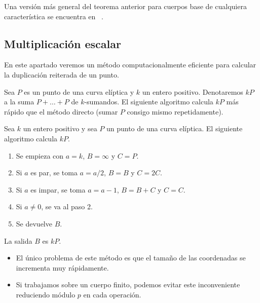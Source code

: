 \begin{nota}
	Una versión más general del teorema anterior para cuerpos base de cualquiera característica se encuentra en ~\cite{Silverman:2009}.
\end{nota}


\subsection{Multiplicación escalar}
\label{sub:Multiplicación escalar}

En este apartado veremos un método computacionalmente eficiente para calcular la duplicación reiterada de un punto.

Sea $P$ es un punto de una curva elíptica y $k$ un entero positivo. Denotaremos $k P$ a la suma $P + \ldots + P$ de $k$-sumandos. El siguiente algoritmo calcula $k P$ más rápido que el método directo (sumar $P$ consigo mismo repetidamente).

\begin{algoritmo}\label{al:multiplicación por duplicación}
	Sea $k$ un entero positivo y sea $P$ un punto de una curva elíptica. El siguiente algoritmo calcula $kP$.
	\begin{enumerate}
		\item Se empieza con $a = k$, $B = \infty$ y $C = P$.
		\item Si $a$ es par, se toma $a = a/2$, $B = B$ y $C = 2 C$.
		\item Si $a$ es impar, se toma $a = a -1$, $B = B + C$ y $C = C$.
		\item Si $a \neq 0$, se va al paso 2.
		\item Se devuelve $B$.
	\end{enumerate}
	La salida $B$ es $kP$.
\end{algoritmo}

\begin{nota}\leavevmode
	\begin{itemize}
		\item El único problema de este método es que el tamaño de las coordenadas se incrementa muy rápidamente.
		\item Si trabajamos sobre un cuerpo finito, podemos evitar este inconveniente reduciendo módulo $p$ en cada operación.
	\end{itemize}
\end{nota}

